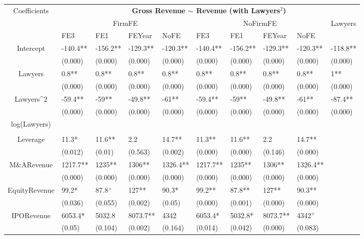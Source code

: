 \documentclass{article}
\begin{document}
\begin{table}[H]
\centering
\begin{tabular}{|clllllllll|}
\hline
\multirow{3}{*}{Coefficients} & \multicolumn{9}{c|}{\textbf{Gross Revenue $\sim$ Revenue (with Lawyers$^2$)}} \\
\cline{2-10}
& \multicolumn{4}{c}{FirmFE} & \multicolumn{4}{c}{NoFirmFE} & \multirow{2}{*}{Lawyers} \\
\cline{2-9}
& FE3 & FE1 & FEYear & NoFE & FE3 & FE1 & FEYear & NoFE &  \\
\hline
 
Intercept & -140.4** & -156.2** & -129.3** & -120.3** & -140.4** & -156.2** & -129.3** & -120.3** & -118.8** \\ 
   & (0.000) & (0.000) & (0.000) & (0.000) & (0.000) & (0.000) & (0.000) & (0.000) & (0.000) \\ 
  Lawyers & 0.8** & 0.8** & 0.8** & 0.8** & 0.8** & 0.8** & 0.8** & 0.8** & 1** \\ 
   & (0.000) & (0.000) & (0.000) & (0.000) & (0.000) & (0.000) & (0.000) & (0.000) & (0.000) \\ 
  Lawyers^2 & -59.4** & -59** & -49.8** & -61** & -59.4** & -59** & -49.8** & -61** & -87.4** \\ 
   & (0.000) & (0.000) & (0.000) & (0.000) & (0.000) & (0.000) & (0.000) & (0.000) & (0.000) \\ 
  log(Lawyers) &  &  &  &  &  &  &  &  &  \\ 
   &  &  &  &  &  &  &  &  &  \\ 
  Leverage & 11.3* & 11.6** & 2.2 & 14.7** & 11.3** & 11.6** & 2.2 & 14.7** &  \\ 
   & (0.012) & (0.01) & (0.563) & (0.002) & (0.000) & (0.000) & (0.146) & (0.000) &  \\ 
  M\&ARevenue & 1217.7** & 1235** & 1306** & 1326.4** & 1217.7** & 1235** & 1306** & 1326.4** &  \\ 
   & (0.000) & (0.000) & (0.000) & (0.000) & (0.000) & (0.000) & (0.000) & (0.000) &  \\ 
  EquityRevenue & 99.2* & 87.8$^{+}$ & 127** & 90.3* & 99.2** & 87.8** & 127** & 90.3** &  \\ 
   & (0.036) & (0.055) & (0.002) & (0.05) & (0.000) & (0.001) & (0.000) & (0.000) &  \\ 
  IPORevenue & 6053.4* & 5032.8 & 8073.7** & 4342 & 6053.4* & 5032.8* & 8073.7** & 4342$^{+}$ &  \\ 
   & (0.05) & (0.104) & (0.002) & (0.164) & (0.014) & (0.042) & (0.000) & (0.083) &  \\ 

\end{tabular}
\end{table}
\end{document}
